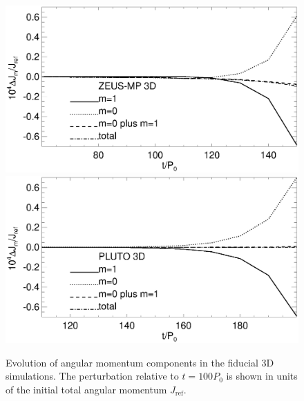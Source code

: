 \begin{figure}
  \includegraphics[scale=.41,clip=true,trim=0cm 1cm 0cm 0cm]{figures/nonaxi_evol_ang_zeus}
  \includegraphics[scale=.41]{figures/nonaxi_evol_ang_pluto}
  \caption{Evolution of angular momentum components in the fiducial 3D 
    simulations. The perturbation
    relative to $t=100P_0$ is shown in units of the
    initial total angular momentum $J_\mathrm{ref}$.\label{3d_angmom}} 
\end{figure}   



